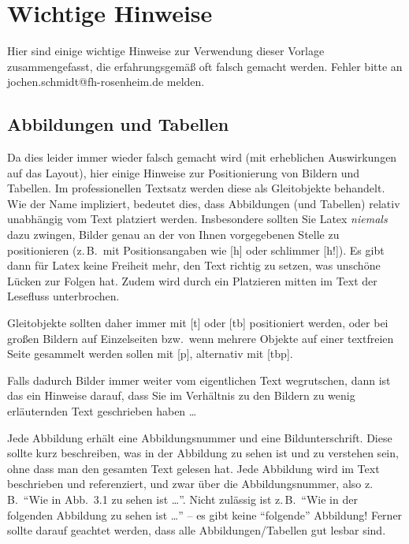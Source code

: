 \chapter{Wichtige Hinweise}
\label{c:intro}

Hier sind einige wichtige Hinweise zur Verwendung dieser Vorlage zusammengefasst, die erfahrungsgemäß oft falsch gemacht werden.
Fehler bitte an jochen.schmidt@fh-rosenheim.de melden.


\section{Abbildungen und Tabellen}
\label{s:intro:abc}

Da dies leider immer wieder falsch gemacht wird (mit erheblichen Auswirkungen auf das Layout), hier einige Hinweise zur Positionierung von Bildern und Tabellen.
Im professionellen Textsatz werden diese als Gleitobjekte behandelt.
Wie der Name impliziert, bedeutet dies, dass Abbildungen (und Tabellen) relativ unabhängig vom Text platziert werden.
Insbesondere sollten Sie Latex \emph{niemals} dazu zwingen, Bilder genau an der von Ihnen vorgegebenen Stelle zu positionieren (z.\,B.\ mit Positionsangaben wie [h] oder schlimmer [h!]).
Es gibt dann für Latex keine Freiheit mehr, den Text richtig zu setzen, was unschöne Lücken zur Folgen hat.
Zudem wird durch ein Platzieren mitten im Text der Lesefluss unterbrochen.

\begin{shaded*}
Gleitobjekte sollten daher immer mit [t] oder [tb] positioniert werden, oder bei großen Bildern auf Einzelseiten bzw.\ wenn mehrere Objekte auf einer textfreien Seite gesammelt werden sollen mit [p], alternativ mit [tbp].
\end{shaded*}

Falls dadurch Bilder immer weiter vom eigentlichen Text wegrutschen, dann ist das ein Hinweise darauf, dass Sie im Verhältnis zu den Bildern zu wenig erläuternden Text geschrieben haben \dots

Jede Abbildung erhält eine Abbildungsnummer und eine Bildunterschrift.
Diese sollte kurz beschreiben, was in der Abbildung zu sehen ist und zu verstehen sein, ohne dass man den gesamten Text gelesen hat.
Jede Abbildung wird im Text beschrieben und referenziert, und zwar über die Abbildungsnummer, also z.\,B.\  "`Wie in Abb.\ 3.1 zu sehen ist \dots"'.
Nicht zulässig ist z.\,B.\ "`Wie in der folgenden Abbildung zu sehen ist \dots"' -- es gibt keine "`folgende"' Abbildung!
Ferner sollte darauf geachtet werden, dass alle Abbildungen/Tabellen gut lesbar sind.


